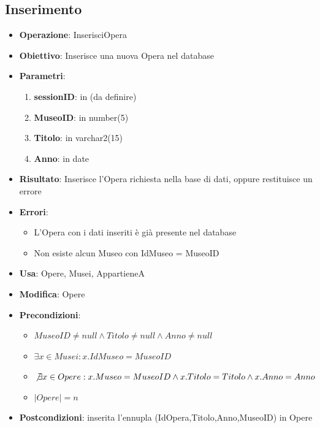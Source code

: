 \documentclass[a4paper,11pt]{article}
\begin{document}
\subsection{Inserimento}
\begin{itemize}
	\item \textbf{Operazione}: InserisciOpera
	\item \textbf{Obiettivo}: Inserisce una nuova Opera nel database
	\item \textbf{Parametri}:
	\begin{enumerate}
		\item \textbf{sessionID}: in (da definire)
		\item \textbf{MuseoID}: in number(5)
		\item \textbf{Titolo}: in varchar2(15)
		\item \textbf{Anno}: in date
	\end{enumerate}
	\item \textbf{Risultato}: Inserisce l'Opera richiesta nella base di dati, oppure restituisce un errore
	\item \textbf{Errori}: 
	\begin{itemize}
		\item L'Opera con i dati inseriti è già presente nel database
		\item Non esiste alcun Museo con IdMuseo = MuseoID
	\end{itemize}
	\item \textbf{Usa}: Opere, Musei, AppartieneA
	\item \textbf{Modifica}: Opere
	\item \textbf{Precondizioni}:
	\begin{itemize}
		\item $MuseoID \ne null \land Titolo \ne null \land Anno \ne null$
		\item $\exists x \in Musei : x.IdMuseo = MuseoID$
		\item $\not\exists x \in Opere : x.Museo = MuseoID \land x.Titolo = Titolo \land x.Anno = Anno$
		\item $|Opere| = n$
	\end{itemize}
	\item \textbf{Postcondizioni}: inserita l'ennupla (IdOpera,Titolo,Anno,MuseoID) in Opere
\end{itemize}

\end{document}
